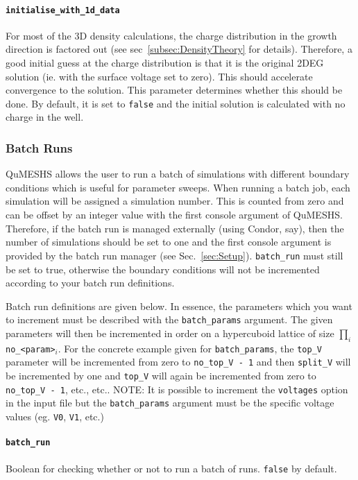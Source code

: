\documentclass[12pt]{article}
\begin{document}
\paragraph{\texttt{initialise\_with\_1d\_data}}
For most of the 3D density calculations, the charge distribution in the growth direction
is factored out (see sec~\ref{subsec:DensityTheory} for details).  Therefore, a good
initial guess at the charge distribution is that it is the original 2DEG solution (ie.
with the surface voltage set to zero).  This should accelerate convergence to the solution.
This parameter determines whether this should be done.  By default, it is set to
\texttt{false} and the initial solution is calculated with no charge in the well.


\subsubsection{Batch Runs}
\label{subsubsec:BatchRuns}

QuMESHS allows the user to run a batch of simulations with different boundary
conditions which is useful for parameter sweeps.  When running a batch job, each
simulation will be assigned a simulation number.  This is counted from zero and can be
offset by an integer value with the first console argument of QuMESHS.  Therefore,
if the batch run is managed externally (using Condor, say), then the number of simulations
should be set to one and the first console argument is provided by the batch run manager
(see Sec.~\ref{sec:Setup}).
\texttt{batch\_run} must still be set to true, otherwise the boundary conditions will
not be incremented according to your batch run definitions.

Batch run definitions are given below.  In essence, the parameters which you want
to increment must be described with the \texttt{batch\_params} argument.  The given
parameters will then be incremented in order on a hypercuboid lattice of size
$\prod_i$ \texttt{no\_<param>}$_i$.  For the concrete example given for
\texttt{batch\_params}, the \texttt{top\_V} parameter will be incremented from
zero to \texttt{no\_top\_V - 1} and then \texttt{split\_V} will be incremented by
one and \texttt{top\_V} will again be incremented from zero to \texttt{no\_top\_V
- 1}, etc., etc..  {\color{red} NOTE:} It is possible to increment the \texttt{voltages}
option in the input file but the \texttt{batch\_params} argument must be the
specific voltage values (eg. \texttt{V0}, \texttt{V1}, etc.)

\paragraph{\texttt{batch\_run}}
Boolean for checking whether or not to run a batch of runs.  \texttt{false} by default.
\end{document}
